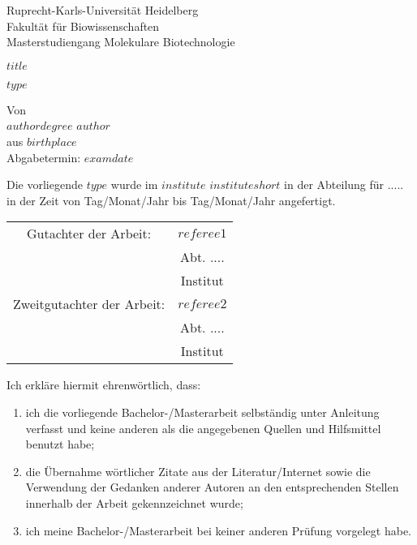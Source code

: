 \documentclass[a4paper,11pt]{article}
\newcommand{\thesistype}{$type$}
\begin{document}
\thispagestyle{empty}
\begin{center}
  {\Large{Ruprecht-Karls-Universität Heidelberg \\
  Fakultät für Biowissenschaften \\
  Masterstudiengang Molekulare Biotechnologie}} \vspace*{\fill}

  \Large{$title$} \\ \vspace*{\fill}

  \Large{\thesistype{}} \\ \vspace*{\fill}

  \Large{Von} \\\vspace{0.5cm}
  \Large{$authordegree$ $author$} \\
  \Large{aus $birthplace$} \\
  \Large{Abgabetermin: $examdate$}

\end{center}
\newpage\null\thispagestyle{empty}\newpage


\newpage
\thispagestyle{empty}
Die vorliegende \thesistype{} wurde im $institute$ $instituteshort$ in der Abteilung für ..... in der Zeit von Tag/Monat/Jahr bis Tag/Monat/Jahr angefertigt.

\vspace*{\fill}
\begin{tabular}{ c c }
Gutachter der Arbeit:       &  $referee1$ \\
                            &  Abt. ....    \\
                            &  Institut \\
Zweitgutachter der Arbeit:  &  $referee2$ \\
                            &  Abt. .... \\
                            &  Institut \\
\end{tabular}


Ich erkläre hiermit ehrenwörtlich, dass:

\begin{enumerate}
    \item   ich die vorliegende Bachelor-/Masterarbeit selbständig unter Anleitung verfasst und keine anderen als die angegebenen Quellen und Hilfsmittel benutzt habe;
    \item   die Übernahme wörtlicher Zitate aus der Literatur/Internet sowie die Verwendung der Gedanken anderer Autoren an den entsprechenden Stellen innerhalb der Arbeit gekennzeichnet wurde;
    \item	ich meine Bachelor-/Masterarbeit bei keiner anderen Prüfung vorgelegt habe.

\end{enumerate}
\end{document}
